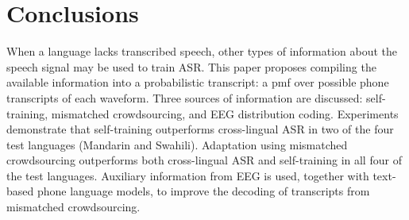 
\section{Conclusions}

When a language lacks transcribed speech, other types of information
about the speech signal may be used to train ASR.  This paper proposes
compiling the available information into a probabilistic
transcript: a pmf over possible phone transcripts of each
waveform.  Three sources of information are discussed: self-training,
mismatched crowdsourcing, and EEG distribution coding.  Experiments
demonstrate that self-training outperforms cross-lingual ASR in two of
the four test languages (Mandarin and Swahili).  Adaptation using
mismatched crowdsourcing outperforms both cross-lingual ASR and
self-training in all four of the test languages.  Auxiliary
information from EEG is used, together with text-based phone language
models, to improve the decoding of transcripts from mismatched
crowdsourcing.  
